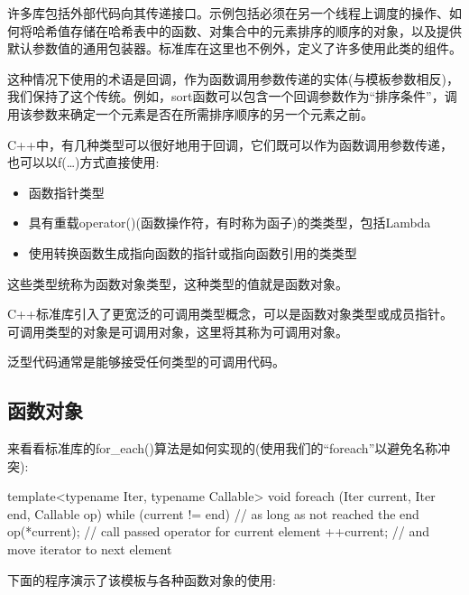 
许多库包括外部代码向其传递接口。示例包括必须在另一个线程上调度的操作、如何将哈希值存储在哈希表中的函数、对集合中的元素排序的顺序的对象，以及提供默认参数值的通用包装器。标准库在这里也不例外，定义了许多使用此类的组件。

这种情况下使用的术语是回调，作为函数调用参数传递的实体(与模板参数相反)，我们保持了这个传统。例如，sort函数可以包含一个回调参数作为“排序条件”，调用该参数来确定一个元素是否在所需排序顺序的另一个元素之前。

C++中，有几种类型可以很好地用于回调，它们既可以作为函数调用参数传递，也可以以f(…)方式直接使用:

\begin{itemize}
\item
函数指针类型

\item
具有重载operator()(函数操作符，有时称为函子)的类类型，包括Lambda

\item
使用转换函数生成指向函数的指针或指向函数引用的类类型
\end{itemize}

这些类型统称为函数对象类型，这种类型的值就是函数对象。

C++标准库引入了更宽泛的可调用类型概念，可以是函数对象类型或成员指针。可调用类型的对象是可调用对象，这里将其称为可调用对象。

泛型代码通常是能够接受任何类型的可调用代码。

\subsection{函数对象}

来看看标准库的for\_each()算法是如何实现的(使用我们的“foreach”以避免名称冲突):

\begin{cpp}
template<typename Iter, typename Callable>
void foreach (Iter current, Iter end, Callable op)
{
	while (current != end) { // as long as not reached the end
		op(*current); // call passed operator for current element
		++current; // and move iterator to next element
	}
}
\end{cpp}

下面的程序演示了该模板与各种函数对象的使用:

